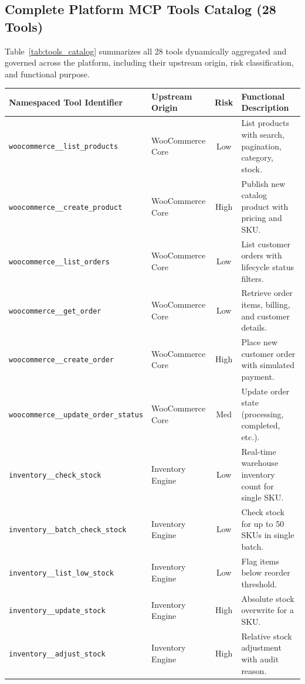\documentclass[11pt,a4paper]{article}
\begin{document}
\subsection{Complete Platform MCP Tools Catalog (28 Tools)}
Table~\ref{tab:tools_catalog} summarizes all 28 tools dynamically aggregated and governed across the platform, including their upstream origin, risk classification, and functional purpose.

\begin{table}[h!]
\centering
\footnotesize
\begin{tabularx}{\textwidth}{p{4.6cm} p{2.5cm} c X}
\toprule
\textbf{Namespaced Tool Identifier} & \textbf{Upstream Origin} & \textbf{Risk} & \textbf{Functional Description} \\
\midrule
\texttt{woocommerce\_\_list\_products}      & WooCommerce Core & Low    & List products with search, pagination, category, stock. \\
\texttt{woocommerce\_\_create\_product}    & WooCommerce Core & High   & Publish new catalog product with pricing and SKU. \\
\texttt{woocommerce\_\_list\_orders}        & WooCommerce Core & Low    & List customer orders with lifecycle status filters. \\
\texttt{woocommerce\_\_get\_order}          & WooCommerce Core & Low    & Retrieve order items, billing, and customer details. \\
\texttt{woocommerce\_\_create\_order}       & WooCommerce Core & High   & Place new customer order with simulated payment. \\
\texttt{woocommerce\_\_update\_order\_status}& WooCommerce Core & Med    & Update order state (processing, completed, etc.). \\
\addlinespace
\texttt{inventory\_\_check\_stock}          & Inventory Engine & Low    & Real-time warehouse inventory count for single SKU. \\
\texttt{inventory\_\_batch\_check\_stock}    & Inventory Engine & Low    & Check stock for up to 50 SKUs in single batch. \\
\texttt{inventory\_\_list\_low\_stock}      & Inventory Engine & Low    & Flag items below reorder threshold. \\
\texttt{inventory\_\_update\_stock}         & Inventory Engine & High   & Absolute stock overwrite for a SKU. \\
\texttt{inventory\_\_adjust\_stock}         & Inventory Engine & High   & Relative stock adjustment with audit reason. \\

\end{tabularx}
\end{table}
\end{document}
